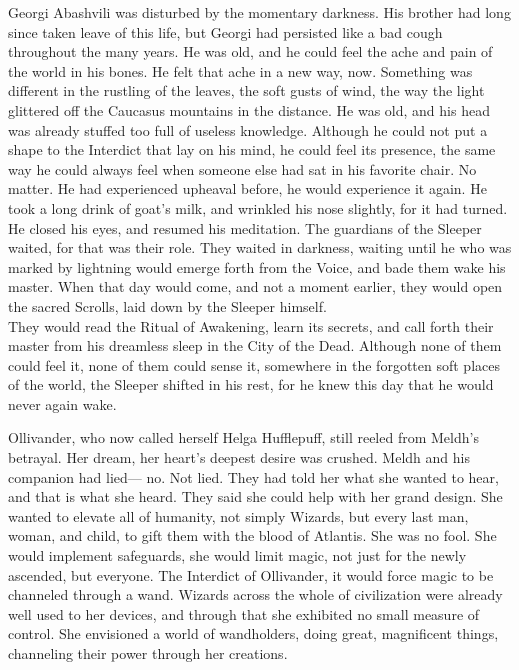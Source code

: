 Georgi Abashvili was disturbed by the momentary darkness. His brother had long since taken leave of this life, but Georgi had persisted like a bad cough throughout the many years. He was old, and he could feel the ache and pain of the world in his bones. He felt that ache in a new way, now. Something was different in the rustling of the leaves, the soft gusts of wind, the way the light glittered off the Caucasus mountains in the distance. He was old, and his head was already stuffed too full of useless knowledge. Although he could not put a shape to the Interdict that lay on his mind, he could feel its presence, the same way he could always feel when someone else had sat in his favorite chair.
\SomeVSpace
No matter. He had experienced upheaval before, he would experience it again. He took a long drink of goat’s milk, and wrinkled his nose slightly, for it had turned. He closed his eyes, and resumed his meditation.
\simpleline
{}
The guardians of the Sleeper waited, for that was their role. They waited in darkness, waiting until he who was marked by lightning would emerge forth from the Voice, and bade them wake his master. When that day would come, and not a moment earlier, they would open the sacred Scrolls, laid down by the Sleeper himself.\\They would read the Ritual of Awakening, learn its secrets, and call forth their master from his dreamless sleep in the City of the Dead.
\SomeVSpace
Although none of them could feel it, none of them could sense it, somewhere in the forgotten soft places of the world, the Sleeper shifted in his rest, for he knew this day that he would never again wake.
\simpleline
{}

Ollivander, who now called herself Helga Hufflepuff, still reeled from Meldh’s betrayal. Her dream, her heart’s deepest desire was crushed. Meldh and his companion had lied\mbox{---} no. Not lied. They had told her what she wanted to hear, and that is what she heard. They said she could help with her grand design.
\SmallVSpace
She wanted to elevate all of humanity, not simply Wizards, but every last man, woman, and child, to gift them with the blood of Atlantis. She was no fool. She would implement safeguards, she would limit magic, not just for the newly ascended, but everyone. The Interdict of Ollivander, it would force magic to be channeled through a wand. Wizards across the whole of civilization were already well used to her devices, and through that she exhibited no small measure of control. She envisioned a world of wandholders, doing great, magnificent things, channeling their power through her creations.
\pagebreak

